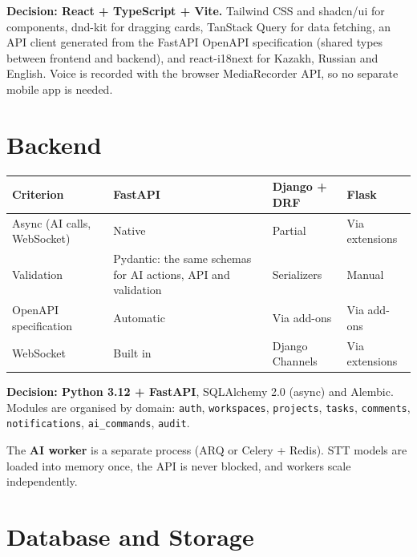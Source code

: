 \documentclass[11pt,a4paper]{article}
\newcommand{\tblstart}{\small\rowcolors{2}{gray!7}{white}}
\newcommand{\code}[1]{\texttt{#1}}
\begin{document}
\textbf{Decision: React + TypeScript + Vite.} Tailwind CSS and shadcn/ui for components, dnd-kit for dragging cards, TanStack Query for data fetching, an API client generated from the FastAPI OpenAPI specification (shared types between frontend and backend), and react-i18next for Kazakh, Russian and English. Voice is recorded with the browser MediaRecorder API, so no separate mobile app is needed.

\section{Backend}

{\tblstart
\begin{xltabular}{\textwidth}{P{3.6cm} L L L}
\toprule
\textbf{Criterion} & \textbf{FastAPI} & \textbf{Django + DRF} & \textbf{Flask} \\
\midrule
\endhead
Async (AI calls, WebSocket) & Native & Partial & Via extensions \\
Validation & Pydantic: the same schemas for AI actions, API and validation & Serializers & Manual \\
OpenAPI specification & Automatic & Via add-ons & Via add-ons \\
WebSocket & Built in & Django Channels & Via extensions \\
\bottomrule
\end{xltabular}}

\textbf{Decision: Python 3.12 + FastAPI}, SQLAlchemy 2.0 (async) and Alembic. Modules are organised by domain: \code{auth}, \code{workspaces}, \code{projects}, \code{tasks}, \code{comments}, \code{notifications}, \code{ai\_commands}, \code{audit}.

The \textbf{AI worker} is a separate process (ARQ or Celery + Redis). STT models are loaded into memory once, the API is never blocked, and workers scale independently.

\section{Database and Storage}
\end{document}
